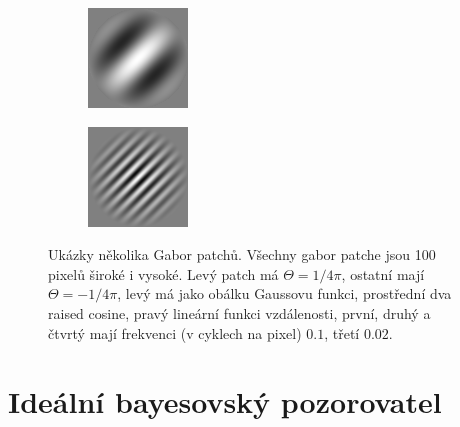 \begin{figure}[h!]
\begin{subfigure}{0.25\textwidth}
  \includegraphics[width=.8\linewidth]{img/gabor3}
\end{subfigure}%
\begin{subfigure}{0.25\textwidth}
  \centering
  \includegraphics[width=.8\linewidth]{img/gabor4}
\end{subfigure}%
\caption{Ukázky několika Gabor patchů. Všechny gabor patche jsou 100 pixelů široké i vysoké. Levý patch má $\Theta = 1/4\pi$, ostatní mají $\Theta = -1/4\pi$, levý má jako obálku Gaussovu funkci, prostřední dva raised cosine, pravý lineární funkci vzdálenosti, první, druhý a čtvrtý mají frekvenci (v cyklech na pixel) $0.1$, třetí $0.02$.} 
\label{obr:gabor:example} 
 
\end{figure}


\section{Ideální bayesovský pozorovatel}
